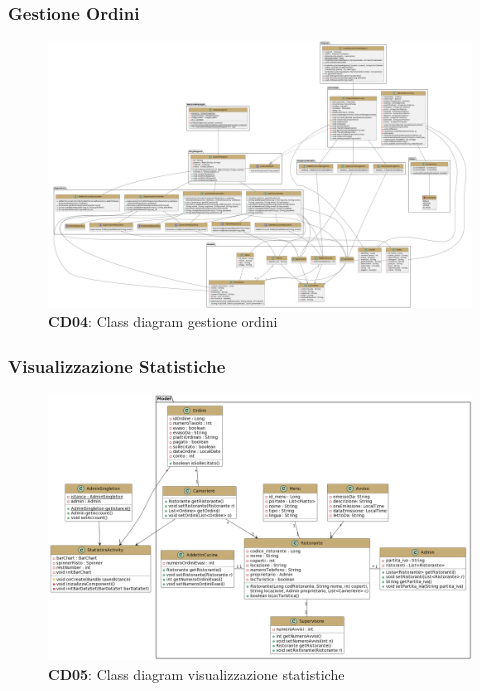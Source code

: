     \subsubsection{Gestione Ordini}
        \begin{figure}[H]
            \centering
            \includegraphics[scale=0.15]{assets/diagrammi/Class diagram di design/Class Diagramm Design Gestione Ordini.png}
            \caption*{\textbf{CD04}: Class diagram gestione ordini}\label{fig:ClassDiagram_ManageOrders}
        \end{figure}
    
    \subsubsection{Visualizzazione Statistiche}
        \begin{figure}[H]
            \centering
            \includegraphics[scale=0.2]{assets/diagrammi/Class diagram di design/gestione statistiche.png}
            \caption*{\textbf{CD05}: Class diagram visualizzazione statistiche}\label{fig:ClassDiagram_ViewStats}
        \end{figure}